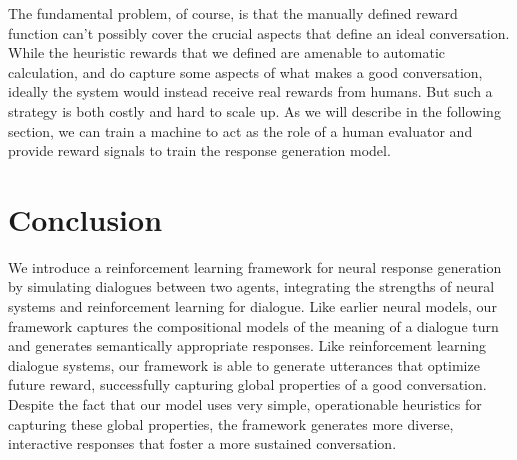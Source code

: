 The fundamental problem, of course, is that the manually defined reward function 
can't possibly cover the crucial aspects that define an ideal conversation. 
While the heuristic rewards that we defined are amenable to automatic calculation,
and do capture some aspects of what makes a good conversation, ideally 
the system would instead receive real rewards from humans. But such a strategy is both costly and hard to scale up.
As we will describe in the following section, we can train a machine to act as the role of a human evaluator and provide reward signals to train the response generation model. 

\section{Conclusion}
We introduce a reinforcement learning framework for neural response
generation by simulating dialogues between two agents, integrating the strengths
of neural \sts systems and reinforcement learning for dialogue.
Like earlier neural \sts models, our framework
captures the compositional models of the meaning of a dialogue turn and 
generates semantically appropriate responses. Like reinforcement learning 
dialogue systems, our framework is able to generate utterances that 
optimize future reward, successfully capturing global properties of a good conversation.
Despite the fact that our model uses very simple, operationable heuristics for capturing these global properties, the framework generates more diverse, interactive responses that foster a more sustained conversation. 

